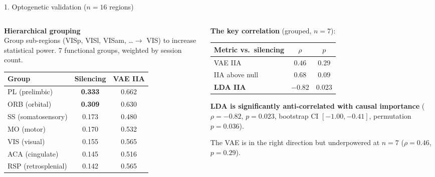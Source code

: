 \documentclass[aspectratio=169,11pt]{beamer}
\begin{document}
\begin{frame}{1. Optogenetic validation ($n = 16$ regions)}
\begin{columns}[T]
\begin{column}{0.5\textwidth}
\textbf{Hierarchical grouping}\\[0.3em]
{\small Group sub-regions (VISp, VISl, VISam, \ldots $\to$ VIS) to increase statistical power. 7 functional groups, weighted by session count.}

\vspace{0.5em}
{\scriptsize
\begin{tabular}{lcc}
\toprule
\textbf{Group} & \textbf{Silencing} & \textbf{VAE IIA} \\
\midrule
PL (prelimbic) & \textbf{0.333} & 0.662 \\
ORB (orbital) & \textbf{0.309} & 0.630 \\
SS (somatosensory) & 0.173 & 0.480 \\
MO (motor) & 0.170 & 0.532 \\
VIS (visual) & 0.155 & 0.565 \\
ACA (cingulate) & 0.145 & 0.516 \\
RSP (retrosplenial) & 0.142 & 0.565 \\
\bottomrule
\end{tabular}
}
\end{column}
\begin{column}{0.48\textwidth}
\textbf{The key correlation} {\scriptsize (grouped, $n = 7$):}

\vspace{0.3em}
{\scriptsize
\begin{tabular}{lcc}
\toprule
\textbf{Metric vs.\ silencing} & $\rho$ & $p$ \\
\midrule
VAE IIA & $0.46$ & $0.29$ \\
IIA above null & $0.68$ & $0.09$ \\
\textbf{LDA IIA} & $\mathbf{-0.82}$ & $\mathbf{0.023}$ \\
\bottomrule
\end{tabular}
}

\vspace{1em}
{\small \textbf{LDA is significantly anti-correlated with causal importance} ($\rho = -0.82$, $p = 0.023$, bootstrap CI $[-1.00, -0.41]$, permutation $p = 0.036$).}

\vspace{0.3em}
{\small The VAE is in the right direction but underpowered at $n = 7$ ($\rho = 0.46$, $p = 0.29$).}
\end{column}
\end{columns}
\end{frame}
\end{document}
